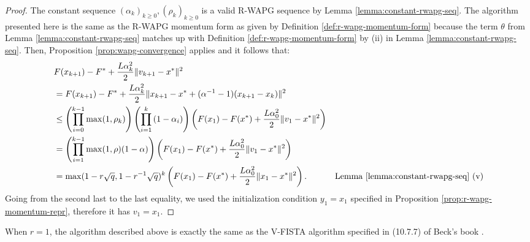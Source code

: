 \documentclass[12pt]{article}
\begin{document}
    \begin{proof}
        The constant sequence $(\alpha_k)_{k \ge 0}, (\rho_k)_{k \ge 0}$ is a valid R-WAPG sequence by Lemma \ref{lemma:constant-rwapg-seq}. 
        The algorithm presented here is the same as the R-WAPG momentum form as given by Definition \ref{def:r-wapg-momentum-form} because the term $\theta$ from Lemma \ref{lemma:constant-rwapg-seq} matches up with Definition \ref{def:r-wapg-momentum-form} by (ii) in Lemma \ref{lemma:constant-rwapg-seq}. 
        Then, Proposition \ref{prop:wapg-convergence} applies and it follows that: 
        \begin{align*}
            & F(x_{k + 1}) - F^* + \frac{L\alpha_k^2}{2}\Vert v_{k + 1} - x^*\Vert^2
            \\
            &= 
            F(x_{k + 1}) - F^* + \frac{L\alpha_k^2}{2}\Vert x_{k + 1}  - x^* + (\alpha^{-1} - 1)(x_{k + 1} - x_k)\Vert^2
            \\
            &\le 
            \left(
                \prod_{i = 0}^{k - 1} \max(1, \rho_{k})
            \right)
            \left(
                \prod_{i = 1}^{k} \left(1  - \alpha_i\right)
            \right)
            \left(
                F(x_1) - F(x^*) + \frac{L\alpha_0^2}{2}\Vert v_1 - x^*\Vert^2
            \right)
            \\
            &= \left(
                \prod_{i = 1}^{k - 1} \max(1, \rho)(1 - \alpha)
            \right)
            \left(
                F(x_1) - F(x^*) + \frac{L\alpha_0^2}{2}\Vert v_1 - x^*\Vert^2
            \right)
            \\
            &= \max(1 - r\sqrt{q}, 1 - r^{-1}\sqrt{q})^k
            \left(
                F(x_1) - F(x^*) + \frac{L\alpha_0^2}{2}\Vert x_1 - x^*\Vert^2
            \right). 
            & \text{Lemma \ref{lemma:constant-rwapg-seq} (v)}
        \end{align*}
        Going from the second last to the last equality, we used the initialization condition $y_1 = x_1$ specified in Proposition \ref{prop:r-wapg-momentum-repr}, therefore it has $v_1 = x_1$. 
    \end{proof}
    \begin{remark}
        When $r = 1$, the algorithm described above is exactly the same as the V-FISTA algorithm specified in (10.7.7) of Beck's book \cite{beck_first-order_2017}. 
    \end{remark}
\end{document}

